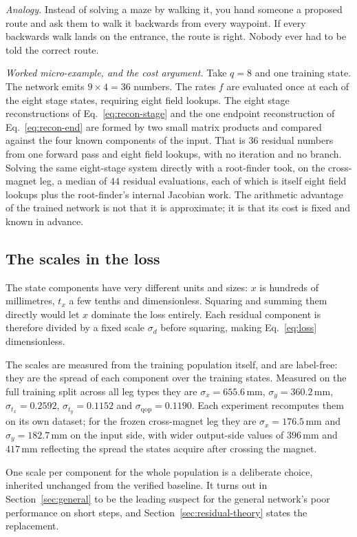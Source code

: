 \documentclass[11pt,a4paper]{article}
\newcommand{\mm}{\ensuremath{\,\mathrm{mm}}}
\newcommand{\qop}{\ensuremath{\mathrm{qop}}}
\begin{document}
\emph{Analogy.} Instead of solving a maze by walking it, you hand someone a
proposed route and ask them to walk it backwards from every waypoint. If every
backwards walk lands on the entrance, the route is right. Nobody ever had to be
told the correct route.

\emph{Worked micro-example, and the cost argument.} Take $q = 8$ and one
training state. The network emits $9 \times 4 = 36$ numbers. The rates $f$ are
evaluated once at each of the eight stage states, requiring eight field lookups.
The eight stage reconstructions of Eq.~\eqref{eq:recon-stage} and the one
endpoint reconstruction of Eq.~\eqref{eq:recon-end} are formed by two small
matrix products and compared against the four known components of the input.
That is $36$ residual numbers from one forward pass and eight field lookups,
with no iteration and no branch. Solving the same eight-stage system directly
with a root-finder took, on the cross-magnet leg, a median of $44$ residual
evaluations, each of which is itself eight field lookups plus the root-finder's
internal Jacobian work. The arithmetic advantage of the trained network is not
that it is approximate; it is that its cost is fixed and known in advance.

\subsection{The scales in the loss}
\label{sec:scales}

The state components have very different units and sizes: $x$ is hundreds of
millimetres, $t_x$ a few tenths and dimensionless. Squaring and summing them
directly would let $x$ dominate the loss entirely. Each residual component is
therefore divided by a fixed scale $\sigma_d$ before squaring, making
Eq.~\eqref{eq:loss} dimensionless.

The scales are measured from the training population itself, and are label-free:
they are the spread of each component over the training states. Measured on the
full training split across all leg types they are $\sigma_x = 655.6\mm$,
$\sigma_y = 360.2\mm$, $\sigma_{t_x} = 0.2592$, $\sigma_{t_y} = 0.1152$ and
$\sigma_{\qop} = 0.1190$. Each experiment recomputes them on its own dataset;
for the frozen cross-magnet leg they are $\sigma_x = 176.5\mm$ and
$\sigma_y = 182.7\mm$ on the input side, with wider output-side values of
$396\mm$ and $417\mm$ reflecting the spread the states acquire after crossing
the magnet.

One scale per component for the whole population is a deliberate choice,
inherited unchanged from the verified baseline. It turns out in
Section~\ref{sec:general} to be the leading suspect for the general network's
poor performance on short steps, and Section~\ref{sec:residual-theory} states
the replacement.
\end{document}
